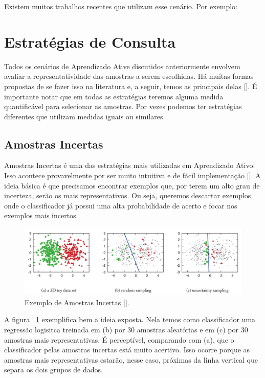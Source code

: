 Existem muitos trabalhos recentes que utilizam esse cenário. Por exemplo: 



\section{Estratégias de Consulta}
\label{sec:query_strategy}

Todos os cenários de Aprendizado Ative discutidos anteriormente envolvem avaliar a representatividade das amostras a serem escolhidas. Há muitas formas propostas de se fazer isso na literatura e, a seguir, temos as principais delas [\cite{settles2012active}]. É importante notar que em todas as estratégias teremos alguma medida quantificável para selecionar as amostras. Por vezes podemos ter estratégias diferentes que utilizam medidas iguais ou similares.




\subsection{Amostras Incertas} %
\label{sec:amostras_incertas}

Amostras Incertas é uma das estratégias mais utilizadas em Aprendizado Ativo. Isso acontece provavelmente por ser muito intuitiva e de fácil implementação [\cite{settles2014active}]. A ideia básica é que precisamos encontrar exemplos que, por terem um alto grau de incerteza, serão os mais representativos. Ou seja, queremos descartar exemplos onde o classificador já possui uma alta probabilidade de acerto e focar nos exemplos mais incertos.  


\begin{figure}
  \centering
  \includegraphics[width=1.0\textwidth]{figures/settles_2014_uncertainty_sampling_example.png}
  \caption{Exemplo de Amostras Incertas [\cite{settles2014active}].}
  \label{fig:settles_2014_uncertainty_example}
\end{figure}

A figura ~\ref{fig:settles_2014_uncertainty_example} exemplifica bem a ideia exposta. Nela temos como classificador uma regressão logisitca treinada em (b) por 30 amostras aleatórias e em (c) por 30 amostras mais representativas. É perceptível, comparando com (a), que o classificador pelas amostras incertas está muito acertivo. Isso ocorre porque as amostras mais representativas estarão, nesse caso, próximas da linha vertical que separa os dois grupos de dados.

